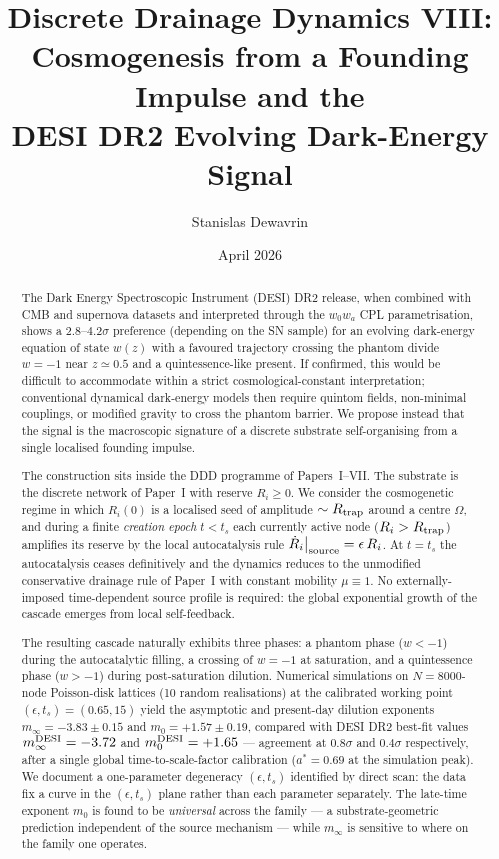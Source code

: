 \documentclass[11pt,a4paper]{article}
\title{\textbf{Discrete Drainage Dynamics VIII:\\
Cosmogenesis from a Founding Impulse and the\\
DESI DR2 Evolving Dark-Energy Signal}}
\author[1]{Stanislas Dewavrin}
\affil[1]{Independent researcher \\ \texttt{dewavrin.iphone@gmail.com}}
\date{April 2026}
\begin{document}
\maketitle

\begin{abstract}
\noindent
The Dark Energy Spectroscopic Instrument (DESI) DR2 release, when
combined with CMB and supernova datasets and interpreted through the
$w_0 w_a$ CPL parametrisation, shows a $2.8\text{--}4.2\sigma$
preference (depending on the SN sample) for an evolving dark-energy
equation of state $w(z)$ with a favoured trajectory crossing the
phantom divide $w = -1$ near $z \simeq 0.5$ and a quintessence-like
present. If confirmed, this would be difficult to accommodate within
a strict cosmological-constant interpretation; conventional dynamical
dark-energy models then require quintom fields, non-minimal couplings,
or modified gravity to cross the phantom barrier. We propose instead
that the signal is the macroscopic signature of a discrete substrate
self-organising from a single localised founding impulse.

The construction sits inside the DDD programme of Papers~I--VII. The
substrate is the discrete network of Paper~I with reserve $R_i \geq 0$.
We consider the cosmogenetic regime in which $R_i(0)$ is a localised
seed of amplitude $\sim R_{\rm trap}$ around a centre $\Omega$, and
during a finite \emph{creation epoch} $t < t_s$ each currently active
node ($R_i > R_{\rm trap}$) amplifies its reserve by the local
autocatalysis rule $\dot R_i\big|_{\rm source} = \epsilon \, R_i$.
At $t = t_s$ the autocatalysis ceases definitively and the dynamics
reduces to the unmodified conservative drainage rule of Paper~I with
constant mobility $\mu \equiv 1$. No externally-imposed time-dependent
source profile is required: the global exponential growth of the
cascade emerges from local self-feedback.

The resulting cascade naturally exhibits three phases: a phantom phase
($w < -1$) during the autocatalytic filling, a crossing of $w = -1$
at saturation, and a quintessence phase ($w > -1$) during
post-saturation dilution. Numerical simulations on $N = 8000$-node
Poisson-disk lattices (10 random realisations) at the calibrated
working point $(\epsilon, t_s) = (0.65, 15)$ yield the asymptotic and
present-day dilution exponents $m_\infty = -3.83 \pm 0.15$ and
$m_0 = +1.57 \pm 0.19$, compared with DESI DR2 best-fit values
$m_\infty^{\rm DESI} = -3.72$ and $m_0^{\rm DESI} = +1.65$ --- agreement
at $0.8\sigma$ and $0.4\sigma$ respectively, after a single global
time-to-scale-factor calibration ($a^\ast = 0.69$ at the simulation
peak). We document a one-parameter degeneracy $(\epsilon, t_s)$
identified by direct scan: the data fix a curve in the $(\epsilon,
t_s)$ plane rather than each parameter separately. The late-time
exponent $m_0$ is found to be \emph{universal} across the family ---
a substrate-geometric prediction independent of the source mechanism
--- while $m_\infty$ is sensitive to where on the family one operates.


\end{abstract}
\end{document}
